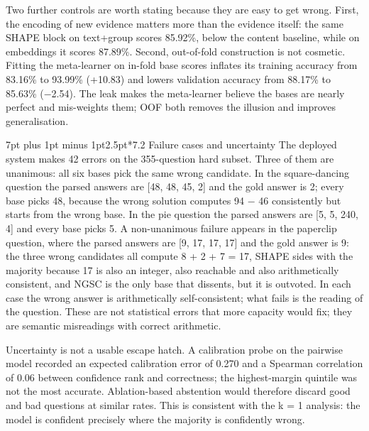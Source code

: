 \documentclass[10pt,a4paper]{article}
\makeatletter
\renewcommand\subsection{\@startsection{subsection}{2}{\z@}%
  {7pt plus 1pt minus 1pt}{2.5pt}{\normalfont\normalsize\bfseries}}
\makeatother
\begin{document}
\vspace{7pt}
Two further controls are worth stating because they are easy to get wrong. First, the encoding of new evidence matters more than the evidence itself: the same SHAPE block on text+group scores 85.92\%, below the content baseline, while on embeddings it scores 87.89\%. Second, out-of-fold construction is not cosmetic. Fitting the meta-learner on in-fold base scores inflates its training accuracy from 83.16\% to 93.99\% (+10.83) and lowers validation accuracy from 88.17\% to 85.63\% ($-$2.54). The leak makes the meta-learner believe the bases are nearly perfect and mis-weights them; OOF both removes the illusion and improves generalisation.

\subsection*{7.2  Failure cases and uncertainty}
The deployed system makes 42 errors on the 355-question hard subset. Three of them are unanimous: all six bases pick the same wrong candidate. In the square-dancing question the parsed answers are [48, 48, 45, 2] and the gold answer is 2; every base picks 48, because the wrong solution computes 94 $-$ 46 consistently but starts from the wrong base. In the pie question the parsed answers are [5, 5, 240, 4] and every base picks 5. A non-unanimous failure appears in the paperclip question, where the parsed answers are [9, 17, 17, 17] and the gold answer is 9: the three wrong candidates all compute 8 + 2 + 7 = 17, SHAPE sides with the majority because 17 is also an integer, also reachable and also arithmetically consistent, and NGSC is the only base that dissents, but it is outvoted. In each case the wrong answer is arithmetically self-consistent; what fails is the reading of the question. These are not statistical errors that more capacity would fix; they are semantic misreadings with correct arithmetic.

Uncertainty is not a usable escape hatch. A calibration probe on the pairwise model recorded an expected calibration error of 0.270 and a Spearman correlation of 0.06 between confidence rank and correctness; the highest-margin quintile was not the most accurate. Ablation-based abstention would therefore discard good and bad questions at similar rates. This is consistent with the k = 1 analysis: the model is confident precisely where the majority is confidently wrong.
\end{document}
